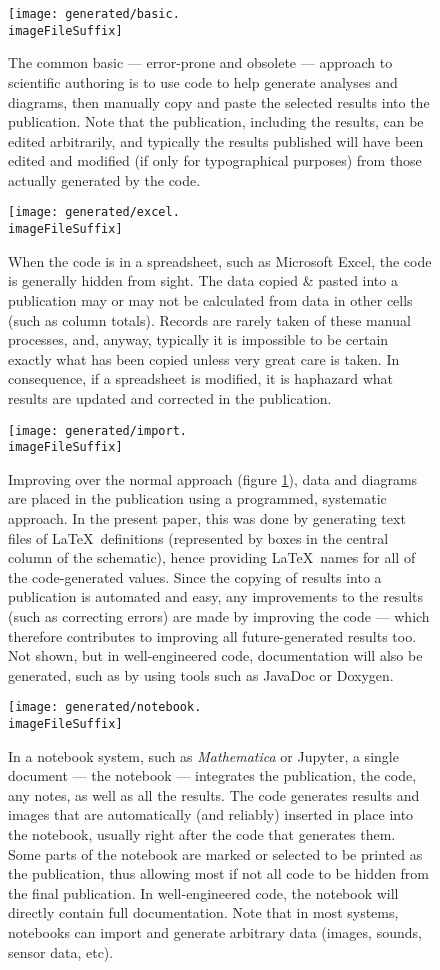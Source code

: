 \documentclass[10pt,a4paper]{article}
\def\imageFileSuffix{jpg}
\begin{document}
\begin{figure} 
   \centering
   \texttt{[image: generated/basic.\\imageFileSuffix]} 
   \caption{The common basic --- error-prone and obsolete --- approach to scientific authoring is to use code to help generate analyses and diagrams, then manually copy and paste the selected results into the publication. Note that the publication, including the results, can be edited arbitrarily, and typically the results published will have been edited and modified (if only for typographical purposes) from those actually generated by the code.}
   \label{supplement-fig:basic}
\end{figure}
\begin{figure} 
   \centering
   \texttt{[image: generated/excel.\\imageFileSuffix]} 
   \caption{When the code is in a spreadsheet, such as Microsoft Excel, the code is generally hidden from sight. The data copied \& pasted into a publication may or may not be calculated from data in other cells (such as column totals). Records are rarely taken of these manual processes, and, anyway, typically it is impossible to be certain exactly what has been copied unless very great care is taken. In consequence, if a spreadsheet is modified, it is haphazard what results are updated and corrected in the publication. }
   \label{supplement-fig:excel}
\end{figure}
\begin{figure} 
   \centering
   \texttt{[image: generated/import.\\imageFileSuffix]} 
   \caption{Improving over the normal approach (figure \ref{supplement-fig:basic}), data and diagrams are placed in the publication using a programmed, systematic approach. In the present paper, this was done by generating text files of \LaTeX\ definitions (represented by boxes in the central column of the schematic), hence providing \LaTeX\ names for all of the code-generated values. Since the copying of results into a publication is automated and easy, any improvements to the results (such as correcting errors) are made by improving the code --- which therefore contributes to improving all future-generated results too. Not shown, but in well-engineered code, documentation will also be generated, such as by using tools such as JavaDoc or Doxygen.}
   \label{supplement-fig:rap}
\end{figure}
\begin{figure}[t]
   \centering
   \texttt{[image: generated/notebook.\\imageFileSuffix]} 
   \caption{In a notebook system, such as \emph{Mathematica\/} or Jupyter, a single document --- the notebook --- integrates the publication, the code, any notes, as well as all the results. The code generates results and images that are automatically (and reliably) inserted in place into the notebook, usually right after the code that generates them. Some parts of the notebook are marked or selected to be printed as the publication, thus allowing most if not all code to be hidden from the final publication. In well-engineered code, the notebook will directly contain full documentation.
Note that in most systems, notebooks can import and generate arbitrary data (images, sounds, sensor data, etc).}
   \label{supplement-fig:notebook}
\end{figure}
\end{document}
